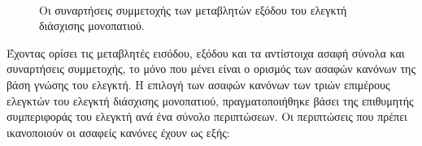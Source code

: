 \bigskip
\begin{figure}[!ht]
	\centering
	\\
	\caption{Οι συναρτήσεις συμμετοχής των μεταβλητών εξόδου του ελεγκτή διάσχισης μονοπατιού.}
	\label{fig:ptc_output_mfs}
\end{figure}

\bigskip
Έχοντας ορίσει τις μεταβλητές εισόδου, εξόδου και τα αντίστοιχα ασαφή σύνολα και συναρτήσεις συμμετοχής, το μόνο που μένει είναι ο ορισμός των ασαφών κανόνων της βάση γνώσης του ελεγκτή. Η επιλογή των ασαφών κανόνων των τριών επιμέρους ελεγκτών του ελεγκτή διάσχισης μονοπατιού, πραγματοποιήθηκε βάσει της επιθυμητής συμπεριφοράς του ελεγκτή ανά ένα σύνολο περιπτώσεων. Οι περιπτώσεις που πρέπει ικανοποιούν οι ασαφείς κανόνες έχουν ως εξής:

